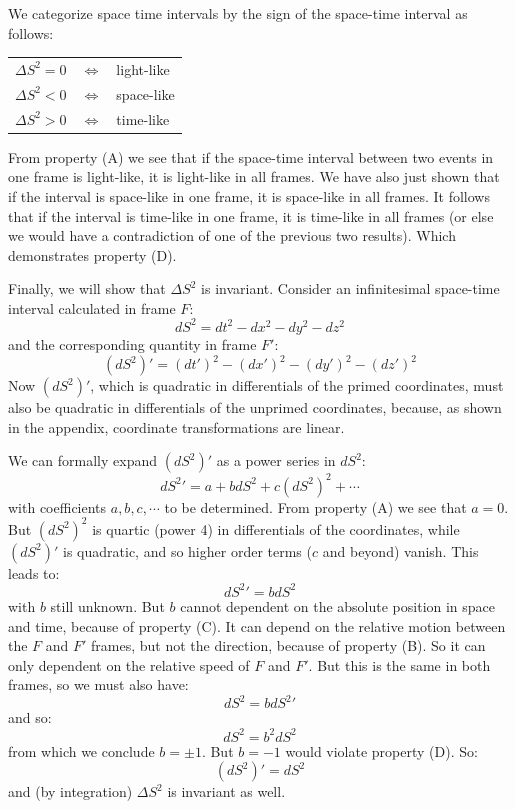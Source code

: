 \documentclass[12pt]{article}
\begin{document}
We categorize space time intervals by the sign of the space-time interval as follows:
\begin{center}
\begin{tabular}{lcl}
  $\Delta S^2 = 0$ & $\iff$ & light-like \\
  $\Delta S^2 < 0$ & $\iff$ & space-like \\
  $\Delta S^2 > 0$ & $\iff$ & time-like \\
\end{tabular}
\end{center}
From property (A) we see that if the space-time interval between two
events in one frame is light-like, it is light-like in all frames.  We
have also just shown that if the interval is space-like in one frame, it is
space-like in all frames.  It follows that if the interval is
time-like in one frame, it is time-like in all frames (or else we
would have a contradiction of one of the previous two results).  Which demonstrates property (D).

Finally, we will show that $\Delta S^2$ is invariant.  Consider an
infinitesimal space-time interval calculated in frame $F$:
\begin{equation}
dS^2 = dt^2 - dx^2 - dy^2 - dz^2
\end{equation}
and the corresponding quantity in frame $F'$:
\begin{equation}
(dS^2)' = (dt')^2 - (dx')^2 - (dy')^2 - (dz')^2
\end{equation}
Now $(dS^2)'$, which is quadratic in differentials of the primed
coordinates, must also be quadratic in differentials of the unprimed
coordinates, because, as shown in the appendix, coordinate
transformations are linear.

We can formally expand $(d{S^2})'$ as a power series in $dS^2$:
$$d{S^2}' = a + b dS^2 + c (dS^2)^2 + \cdots $$ with coefficients
$a,b,c,\cdots$ to be determined.  From property (A) we see that $a=0$.
But $(dS^2)^2$ is quartic (power 4) in differentials of the
coordinates, while $(dS^2)'$ is quadratic, and so higher order terms
($c$ and beyond) vanish.  This leads to:
$$d{S^2}' = b dS^2$$
with $b$ still unknown.  But $b$ cannot dependent on the
absolute position in space and time, because of property (C).  It can
depend on the relative motion between the $F$ and $F'$ frames, but not
the direction, because of property (B).  So it can only dependent on
the relative speed of $F$ and $F'$.  But this is the same in both
frames, so we must also have:
$$d{S^2} = b d{S^2}'$$
and so:
$$d{S^2} = b^2 d{S^2}$$
from which we conclude $b=\pm1$.  But $b=-1$ would violate property (D).  So:
$$(d{S^2})' = d{S^2}$$
and (by integration) $\Delta S^2$ is invariant as well.
\end{document}
